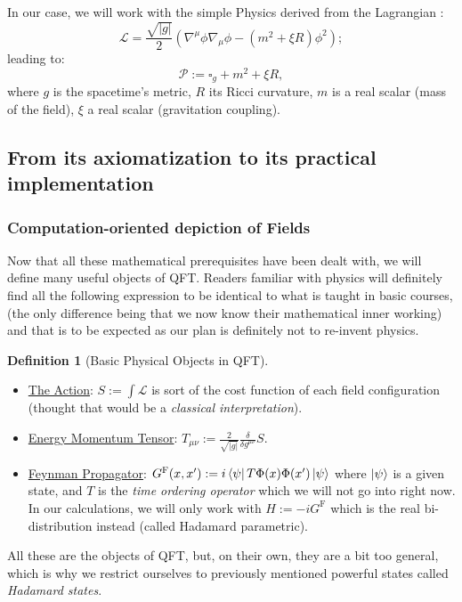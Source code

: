 \documentclass[a4paper,11pt]{article}
\numberwithin{equation}{section}
\theoremstyle{definition}
\newtheorem{definition}{Definition}
\begin{document}
\noindent In our case, we will work with the simple Physics derived from the Lagrangian :
        \begin{equation}
        \mathcal{L}=\frac{\sqrt{|g|}}{2}\left(\nabla^\mu\phi\nabla_\mu\phi- (m^2+\xi R)\phi^2\right);
        \end{equation}
        leading to:
        \begin{equation}
        \mathcal{P}:=\square_g + m^2 + \xi R,
        \end{equation}
        where $g$ is the spacetime's metric, $R$ its Ricci curvature, $m$ is a real scalar (mass of the field), $\xi$ a real scalar (gravitation coupling).

        
\subsection{From its axiomatization to its practical implementation}
\subsubsection{Computation-oriented depiction of Fields}
        Now that all these mathematical prerequisites have been dealt with, we will define many useful objects of QFT. Readers familiar with physics will definitely find all the following expression to be identical to what is taught in basic courses, (the only difference being that we now know their mathematical inner working) and that is to be expected as our plan is definitely not to re-invent physics.

        \begin{definition}[Basic Physical Objects in QFT]$\quad$
        \begin{itemize}
            \item \underline{The Action}: $S:= \int \mathcal{L}$ is sort of the cost function of each field configuration (thought that would be a \emph{classical interpretation}).
            \item \underline{Energy Momentum Tensor}: $T_{\mu\nu}:=\frac{2}{\sqrt{|g|}}\frac{\delta}{\delta g^{\mu\nu}}S.$
            \item \underline{Feynman Propagator}: $G^\mathrm{F}(x,x'):=i\bra{\psi}T\Phi(x)\Phi(x')\ket{\psi}$ where $\ket{\psi}$ is a given state, and $T$ is the \emph{time ordering operator} which we will not go into right now. In our calculations, we will only work with $H:=-iG^\mathrm{F}$ which is the real bi-distribution instead (called Hadamard parametric). 
        \end{itemize}
        \end{definition}
        All these are the objects of QFT, but, on their own, they are a bit too general, which is why we restrict ourselves to previously mentioned powerful states called \emph{Hadamard states}.
\end{document}
